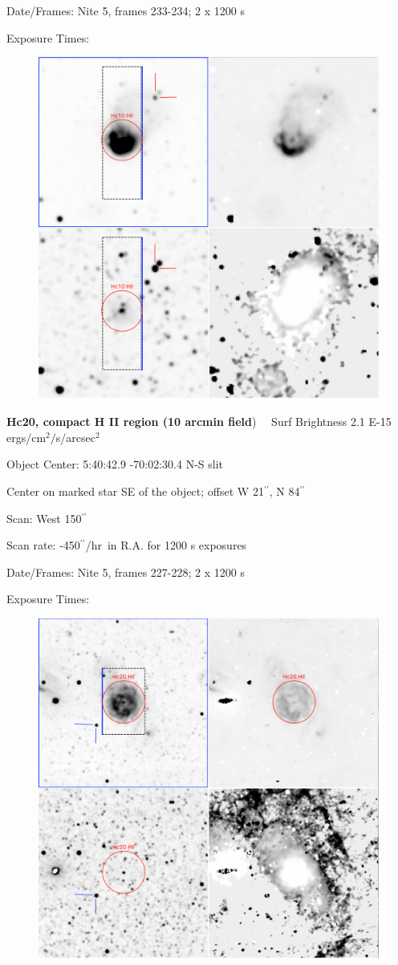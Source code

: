 \documentclass[11pt]{article}
\newcommand{\arcsec}{$^{\prime\prime}$}
\begin{document}
Date/Frames:  Nite 5, frames 233-234;  2 x 1200 s

Exposure Times:  

\begin{figure}
\includegraphics[width=12.5cm]{snapshots/Hc10_HII.png}
\end{figure}

\newpage 
 
{\bf Hc20, compact H II region (10 arcmin field})   \ \   Surf Brightness 2.1 E-15 ergs/cm$^2/$s/arcsec$^2$

Object Center:  5:40:42.9    -70:02:30.4   N-S slit

Center on marked star SE of the object; offset W 21\arcsec,  N 84\arcsec

Scan:    West 150\arcsec

Scan rate:  -450\arcsec/hr\ in R.A. for 1200 s exposures

Date/Frames:  Nite 5, frames 227-228; 2 x 1200 s

Exposure Times:  

\begin{figure}
\includegraphics[width=12.5cm]{snapshots/Hc20_HII.png}
\end{figure}
\end{document}
